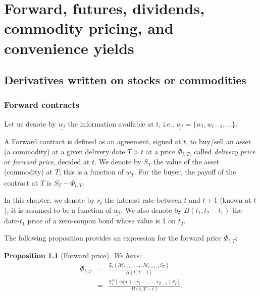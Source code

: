 \documentclass[
  12pt,
]{book}
\newtheorem{proposition}{Proposition}[chapter]
\theoremstyle{definition}
\theoremstyle{definition}
\theoremstyle{definition}
\theoremstyle{definition}
\theoremstyle{remark}
\begin{document}
\hypertarget{forward-futures-dividends-commodity-pricing-and-convenience-yields}{%
\chapter{Forward, futures, dividends, commodity pricing, and convenience yields}\label{forward-futures-dividends-commodity-pricing-and-convenience-yields}}

\hypertarget{derivatives-written-on-stocks-or-commodities}{%
\section{Derivatives written on stocks or commodities}\label{derivatives-written-on-stocks-or-commodities}}

\hypertarget{FCFPForwards}{%
\subsection{Forward contracts}\label{FCFPForwards}}

Let us denote by \(\underline{w_{t}}\) the information available at \(t\), i.e., \(\underline{w_{t}}= \{w_t,w_{t-1},\dots\}\).

A Forward contract is defined as an agreement, signed at \(t\), to buy/sell an asset (a commodity) at a given delivery date \(T>t\) at a price \(\Phi_{t,T}\), called \emph{delivery price} or \emph{forward price}, decided at \(t\). We denote by \(S_T\) the value of the asset (commodity) at \(T\); this is a function of \(\underline{w_{T}}\). For the buyer, the payoff of the contract at \(T\) is \(S_T - \Phi_{t,T}\).

In this chapter, we denote by \(r_t\) the interest rate between \(t\) and \(t+1\) (known at \(t\)), it is assumed to be a function of \(\underline{w_{t}}\). We also denote by \(B(t_1,t_2-t_1)\) the date-\(t_1\) price of a zero-coupon bond whose value is 1 on \(t_2\).

The following proposition provides an expression for the forward price \(\Phi_{t,T}\):

\begin{proposition}[Forward price]
\protect\hypertarget{prp:fwd}{}\label{prp:fwd}We have:
\begin{eqnarray*}
\Phi_{t,T} & = & \frac{\mathbb{E}_t (\mathcal{M}_{t,t+1}, \ldots, \mathcal{M}_{t-1,T} S_T)}{B(t,T-t)}\\
& = & \frac{\mathbb{E}^{\mathbb{Q}}_t [\exp (-r_t - \ldots - r_{T-1}) S_T]}{B(t,T-t)}.
\end{eqnarray*}
\end{proposition}
\end{document}
